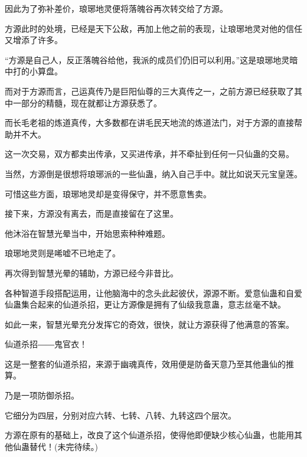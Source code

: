 \begin{this_body}
因此为了弥补差价，琅琊地灵便将落魄谷再次转交给了方源。

方源此时的处境，已经是天下公敌，再加上他之前的表现，让琅琊地灵对他的信任又增添了许多。

“方源是自己人，反正落魄谷给他，我派的成员们仍旧可以利用。”这是琅琊地灵暗中打的小算盘。

而对于方源而言，己运真传乃是巨阳仙尊的三大真传之一，之前方源已经获取了其中一部分的精髓，现在就都让方源获悉了。

而长毛老祖的炼道真传，大多数都在讲毛民天地流的炼道法门，对于方源的直接帮助并不大。

这一次交易，双方都卖出传承，又买进传承，并不牵扯到任何一只仙蛊的交易。

当然，方源倒是很想将琅琊派的一些仙蛊，纳入自己手中。就比如说天元宝皇莲。

可惜这些方面，琅琊地灵却是变得保守，并不愿意售卖。

接下来，方源没有离去，而是直接留在了这里。

他沐浴在智慧光晕当中，开始思索种种难题。

琅琊地灵则是唏嘘不已地走了。

再次得到智慧光晕的辅助，方源已经今非昔比。

各种智道手段搭配运用，让他脑海中的念头此起彼伏，源源不断。爱意仙蛊和自爱仙蛊集合起来的仙道杀招，更让方源像是拥有了仙级我意蛊，意志丝毫不缺。

如此一来，智慧光晕充分发挥它的奇效，很快，就让方源获得了他满意的答案。

仙道杀招――鬼官衣！

这是一整套的仙道杀招，来源于幽魂真传，效用便是防备天意乃至其他蛊仙的推算。

乃是一项防御杀招。

它细分为四层，分别对应六转、七转、八转、九转这四个层次。

方源在原有的基础上，改良了这个仙道杀招，使得他即便缺少核心仙蛊，也能用其他仙蛊替代！(未完待续。)

\end{this_body}

